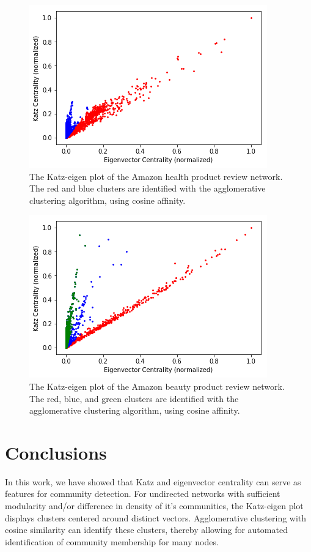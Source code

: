 \documentclass{IEEEtran}
\begin{document}
	\begin{figure}
		\centering
		\includegraphics[width=0.98\linewidth]{amazon_health_clustered.png}
		\caption{The Katz-eigen plot of the Amazon health product review network. The red and blue clusters are identified with the agglomerative clustering algorithm, using cosine affinity.}
		\label{fig:amazon_health}
	\end{figure}

	\begin{figure}
		\centering
		\includegraphics[width=0.98\linewidth]{amazon_beauty_clustered.png}
		\caption{The Katz-eigen plot of the Amazon beauty product review network. The red, blue, and green clusters are identified with the agglomerative clustering algorithm, using cosine affinity.}
		\label{fig:amazon_beauty}
	\end{figure}
	
	\section{Conclusions}
	In this work, we have showed that Katz and eigenvector centrality can serve as features for community detection. For undirected networks with sufficient modularity and/or difference in density of it's communities, the Katz-eigen plot displays clusters centered around distinct vectors. Agglomerative clustering with cosine similarity can identify these clusters, thereby allowing for automated identification of community membership for many nodes.
	
\end{document}
